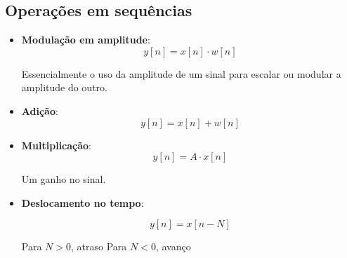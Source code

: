 \subsection{Operações em sequências}
\begin{itemize}
    \item \textbf{Modulação em amplitude}:
    \[y[n] = x[n] \cdot w[n] \]

    Essencialmente o uso da amplitude de um sinal para escalar ou modular a amplitude do outro.

    \item \textbf{Adição}:
    \[y[n] = x[n] + w[n] \]

    \item \textbf{Multiplicação}:
    \[y[n] = A \cdot x[n] \]

    Um ganho no sinal.

    \item \textbf{Deslocamento no tempo}:
    
    \[y[n] = x[n - N] \]

    Para $N > 0$, atraso
    Para $N < 0$, avanço

    
    
\end{itemize}